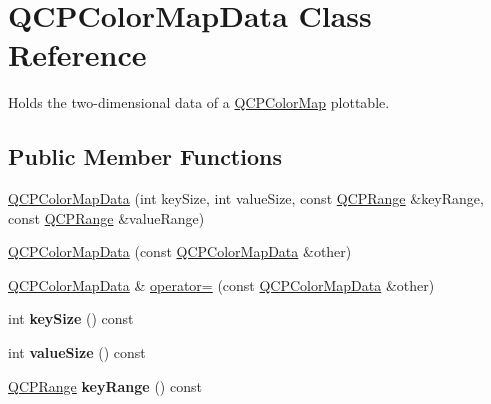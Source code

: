\hypertarget{class_q_c_p_color_map_data}{}\section{Q\+C\+P\+Color\+Map\+Data Class Reference}
\label{class_q_c_p_color_map_data}


Holds the two-\/dimensional data of a \mbox{\hyperlink{class_q_c_p_color_map}{Q\+C\+P\+Color\+Map}} plottable.  


\subsection*{Public Member Functions}
\begin{DoxyCompactItemize}
\item 
\mbox{\hyperlink{class_q_c_p_color_map_data_aac9d8eb81e18e240d89d56c01933fd23}{Q\+C\+P\+Color\+Map\+Data}} (int key\+Size, int value\+Size, const \mbox{\hyperlink{class_q_c_p_range}{Q\+C\+P\+Range}} \&key\+Range, const \mbox{\hyperlink{class_q_c_p_range}{Q\+C\+P\+Range}} \&value\+Range)
\item 
\mbox{\hyperlink{class_q_c_p_color_map_data_a7f2145d86473263494abb9bf1de20436}{Q\+C\+P\+Color\+Map\+Data}} (const \mbox{\hyperlink{class_q_c_p_color_map_data}{Q\+C\+P\+Color\+Map\+Data}} \&other)
\item 
\mbox{\hyperlink{class_q_c_p_color_map_data}{Q\+C\+P\+Color\+Map\+Data}} \& \mbox{\hyperlink{class_q_c_p_color_map_data_afdf4dd1b2f5714234fe84709b85c2a8d}{operator=}} (const \mbox{\hyperlink{class_q_c_p_color_map_data}{Q\+C\+P\+Color\+Map\+Data}} \&other)
\item 
\mbox{\label{class_q_c_p_color_map_data_abbda4d28de97aedce1e6e6f008a0a1f7}} 
int {\bfseries key\+Size} () const
\item 
\mbox{\label{class_q_c_p_color_map_data_a8510cafea24645bbb62b5e0bfc43209f}} 
int {\bfseries value\+Size} () const
\item 
\mbox{\label{class_q_c_p_color_map_data_a1e43abd20a77b922b7cecfc69bf4dad7}} 
\mbox{\hyperlink{class_q_c_p_range}{Q\+C\+P\+Range}} {\bfseries key\+Range} () const
\item 
\mbox{\label{class_q_c_p_color_map_data_a818e4e384aa4e5fad69ac603924394d3}} 

\end{DoxyCompactItemize}
